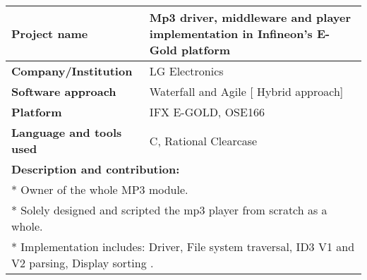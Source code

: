 \documentclass[letterpaper]{twentysecondcv} %
\begin{document}
\vspace{6mm}  
\begin{tabular}{ |p{7cm}|p{13cm}| }
\hline
\rowcolor{sidecolor} 
\textbf{{\large Project name}} & \textbf{Mp3 driver, middleware and player implementation in Infineon's E-Gold platform}\\[2ex]
 \hline
\rowcolor{sidecolor}
\textbf{{\large Company/Institution}} & LG Electronics\\[2ex]
 \hline
 \textbf{{\large Software approach}} & Waterfall and Agile [ Hybrid approach] \\[2ex]
 \hline
 \textbf{{\large Platform}} & IFX E-GOLD, OSE166 \\[2ex]
 \hline
  \textbf{{\large Language and tools used}} & C, Rational Clearcase \\[2ex]
 \hline
 
 \multicolumn{2}{l}{
 \textbf{\large Description and contribution:}} \\[2ex]
 \multicolumn{2}{l}{
 	* Owner of the whole MP3 module.}\\
 \multicolumn{2}{l}{
 	* Solely designed and scripted the mp3 player from scratch as a whole.}\\
 \multicolumn{2}{l}{
 	* Implementation includes: Driver, File system traversal, ID3 V1 and V2 parsing, Display sorting .
 	}\\
 \hline
 \hline
 \end{tabular}
 \vspace{2mm}
\end{document}
